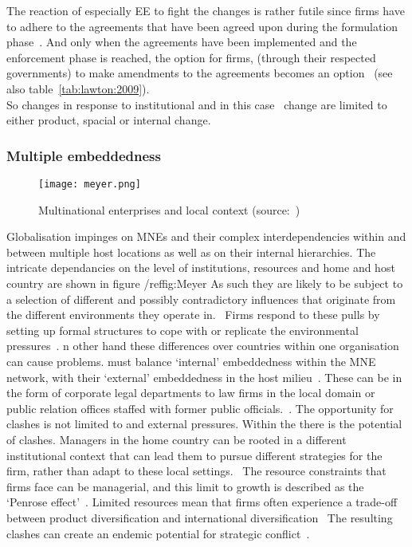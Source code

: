 The reaction of especially \gls{EE} \mne to fight the changes is rather futile since firms have to adhere to the agreements that have been agreed upon during the formulation phase~\cite{Lawton:2005wo}.
And only when the agreements have been implemented and the enforcement phase is reached, the option for firms, (through their respected governments) to make amendments to the agreements becomes an option~\cite{Lawton:2005wo} (see also table~\ref{tab:lawton:2009}).\\
So changes in response to institutional and in this case \wto~change are limited to either product, spacial or internal change.


\subsubsection{Multiple embeddedness}

\begin{figure}[htbp] 
	\centering
	\texttt{[image: meyer.png]}
 	\caption[Multinational enterprises and local context]{Multinational enterprises and local context (source:~\cite{Meyer:2011vt})}\label{fig:Meyer}
\end{figure}

Globalisation impinges on MNEs and their complex interdependencies within and between multiple host locations as well as on their internal hierarchies.\cite{Meyer:2011vt} 
The intricate dependancies on the level of institutions, resources and home and host country are shown in figure /ref{fig:Meyer}
As such they are likely to be subject to a selection of different and possibly contradictory influences that originate from the different environments they operate in.~\cite{Westney:2005vv}
Firms respond to these \iso pulls by setting up formal structures to cope with or replicate the environmental pressures~\cite{Westney:2005vv}. 
n other hand these differences over countries within one organisation can cause problems.
\mne must balance ‘internal’ embeddedness within the MNE network, with their ‘external’ embeddedness in the host milieu~\cite{Meyer:2011vt}.
These can be in the form of corporate legal departments \iso to law firms in the local domain or public relation offices staffed with former public officials.~\cite{Westney:2005vv}. 
The opportunity for clashes is not limited to \mne and external pressures.
Within the \mne there is the potential of clashes. 
Managers in the home country can be rooted in a different institutional context that can lead them to pursue different strategies for the firm, rather than adapt to these local settings.~\cite{Jackson:2008cz}
The resource constraints that firms face can be managerial, and this limit to growth is described as the ‘Penrose effect’~\cite{Hutzschenreuter:2011bv}. 
Limited resources mean that firms often experience a trade-off between product diversification and international diversification~\cite{Dunning:2008}
The resulting clashes can create an endemic potential for strategic conflict~\cite{Jackson:2008cz}.\\


